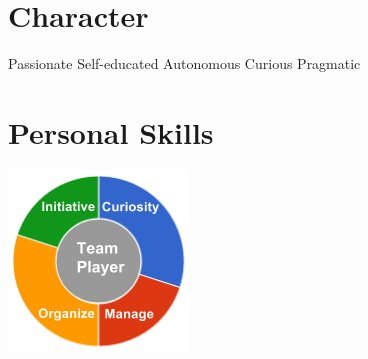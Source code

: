 \documentclass[]{friggeri-cv}
\begin{document}
\begin{aside}
~
~
~
    \section{Character}
        Passionate
        Self-educated
        Autonomous
        Curious
        Pragmatic
        ~
    \section{Personal Skills}
        \includegraphics[scale=0.62]{img/personal.png}
        ~
\end{aside}

\newpage
\end{document}
